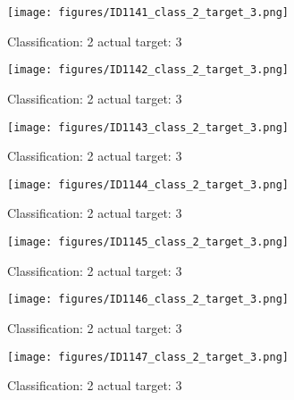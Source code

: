 \begin{figure}[h!]
\begin{center}
\texttt{[image: figures/ID1141\_class\_2\_target\_3.png]}
\end{center}
\caption{ Classification: 2 actual target: 3}
\label{fig:ID1141_class_2_target_3}
\end{figure}
\begin{figure}[h!]
\begin{center}
\texttt{[image: figures/ID1142\_class\_2\_target\_3.png]}
\end{center}
\caption{ Classification: 2 actual target: 3}
\label{fig:ID1142_class_2_target_3}
\end{figure}
\begin{figure}[h!]
\begin{center}
\texttt{[image: figures/ID1143\_class\_2\_target\_3.png]}
\end{center}
\caption{ Classification: 2 actual target: 3}
\label{fig:ID1143_class_2_target_3}
\end{figure}
\begin{figure}[h!]
\begin{center}
\texttt{[image: figures/ID1144\_class\_2\_target\_3.png]}
\end{center}
\caption{ Classification: 2 actual target: 3}
\label{fig:ID1144_class_2_target_3}
\end{figure}
\begin{figure}[h!]
\begin{center}
\texttt{[image: figures/ID1145\_class\_2\_target\_3.png]}
\end{center}
\caption{ Classification: 2 actual target: 3}
\label{fig:ID1145_class_2_target_3}
\end{figure}
\begin{figure}[h!]
\begin{center}
\texttt{[image: figures/ID1146\_class\_2\_target\_3.png]}
\end{center}
\caption{ Classification: 2 actual target: 3}
\label{fig:ID1146_class_2_target_3}
\end{figure}
\begin{figure}[h!]
\begin{center}
\texttt{[image: figures/ID1147\_class\_2\_target\_3.png]}
\end{center}
\caption{ Classification: 2 actual target: 3}
\label{fig:ID1147_class_2_target_3}
\end{figure}
